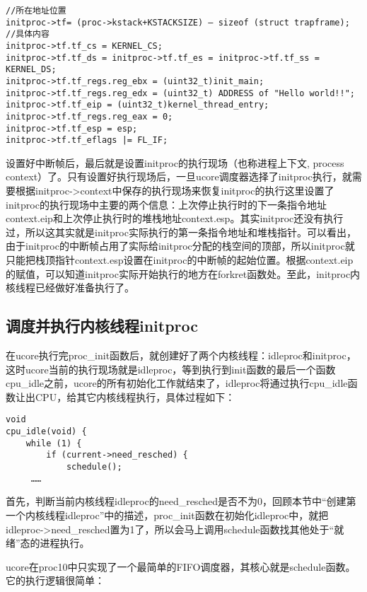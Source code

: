\begin{lstlisting}
//所在地址位置
initproc->tf= (proc->kstack+KSTACKSIZE) – sizeof (struct trapframe);   
//具体内容
initproc->tf.tf_cs = KERNEL_CS;
initproc->tf.tf_ds = initproc->tf.tf_es = initproc->tf.tf_ss = KERNEL_DS;
initproc->tf.tf_regs.reg_ebx = (uint32_t)init_main;
initproc->tf.tf_regs.reg_edx = (uint32_t) ADDRESS of "Hello world!!";
initproc->tf.tf_eip = (uint32_t)kernel_thread_entry;
initproc->tf.tf_regs.reg_eax = 0; 
initproc->tf.tf_esp = esp;
initproc->tf.tf_eflags |= FL_IF;
\end{lstlisting}

设置好中断帧后，最后就是设置initproc的执行现场（也称进程上下文, process
context）了。只有设置好执行现场后，一旦ucore调度器选择了initproc执行，就需要根据initproc-\textgreater{}context中保存的执行现场来恢复initproc的执行这里设置了initproc的执行现场中主要的两个信息：上次停止执行时的下一条指令地址context.eip和上次停止执行时的堆栈地址context.esp。其实initproc还没有执行过，所以这其实就是initproc实际执行的第一条指令地址和堆栈指针。可以看出，由于initproc的中断帧占用了实际给initproc分配的栈空间的顶部，所以initproc就只能把栈顶指针context.esp设置在initproc的中断帧的起始位置。根据context.eip的赋值，可以知道initproc实际开始执行的地方在forkret函数处。至此，initproc内核线程已经做好准备执行了。

\subsection{调度并执行内核线程initproc}\label{ux8c03ux5ea6ux5e76ux6267ux884cux5185ux6838ux7ebfux7a0binitproc}

在ucore执行完proc\_init函数后，就创建好了两个内核线程：idleproc和initproc，这时ucore当前的执行现场就是idleproc，等到执行到init函数的最后一个函数cpu\_idle之前，ucore的所有初始化工作就结束了，idleproc将通过执行cpu\_idle函数让出CPU，给其它内核线程执行，具体过程如下：

\begin{lstlisting}
void
cpu_idle(void) {
    while (1) {
        if (current->need_resched) {
            schedule();
     ……
\end{lstlisting}

首先，判断当前内核线程idleproc的need\_resched是否不为0，回顾本节中``创建第一个内核线程idleproc''中的描述，proc\_init函数在初始化idleproc中，就把idleproc-\textgreater{}need\_resched置为1了，所以会马上调用schedule函数找其他处于``就绪''态的进程执行。

ucore在proc10中只实现了一个最简单的FIFO调度器，其核心就是schedule函数。它的执行逻辑很简单：

